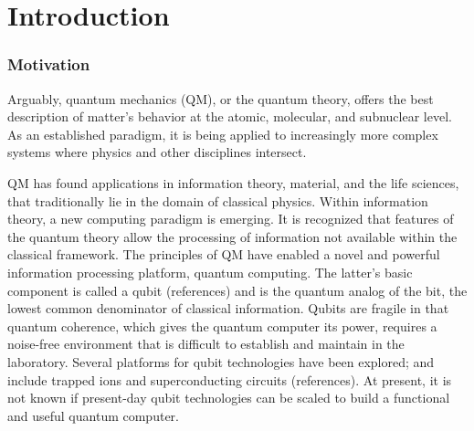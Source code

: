 \selectfont
\setcounter{chapter}{0}
\chapter{Introduction}

\label{introduction}
 
\subsection{Motivation}
Arguably, quantum mechanics (QM), or the quantum theory, offers the best description of matter's behavior at the atomic, molecular, and subnuclear level. As an established paradigm, it is being applied to increasingly more complex systems where physics and other disciplines intersect.

QM has found applications in information theory, material, and the life sciences, that traditionally lie in the domain of classical physics. Within information theory, a new computing paradigm is emerging. It is recognized that features of the quantum theory allow the processing of information \cite{QIP} not available within the classical framework.
The principles of QM have enabled a novel and powerful information processing platform, quantum computing. The latter's basic component is called a qubit (references) and is the quantum analog of the bit, the lowest common denominator of classical information. Qubits are fragile in that quantum coherence, which gives the quantum computer its power, requires a noise-free environment that is difficult to establish and maintain in the laboratory. Several platforms for qubit technologies have been explored; and
include trapped ions and superconducting circuits (references). At present, it is not known if present-day qubit technologies can be scaled to build a functional and useful quantum computer.

